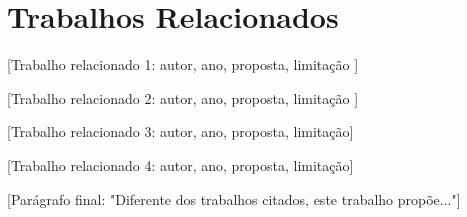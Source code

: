 \section{Trabalhos Relacionados}
\label{sec:trabalhos}


[Trabalho relacionado 1: autor, ano, proposta, limitação \cite{inproceedings_stub}]

[Trabalho relacionado 2: autor, ano, proposta, limitação \cite{thesis_stub}]

[Trabalho relacionado 3: autor, ano, proposta, limitação]

[Trabalho relacionado 4: autor, ano, proposta, limitação]

[Parágrafo final: "Diferente dos trabalhos citados, este trabalho propõe..."]
